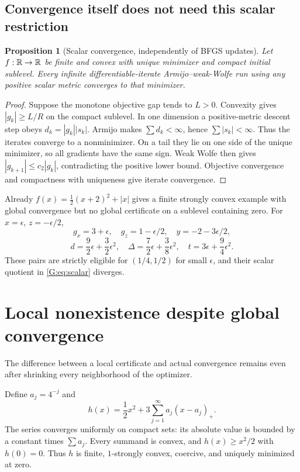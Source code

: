 \documentclass[10pt,oneside,openany]{book}
\newtheorem{proposition}{Proposition}[chapter]
\theoremstyle{remark}\newtheorem{remark}{Remark}[chapter]
\begin{document}
\subsection{Convergence itself does not need this scalar restriction}
\begin{proposition}[Scalar convergence, independently of BFGS updates]\label{G:prop:scalarconv}
Let $f:\mathbb R\to\mathbb R$ be finite and convex with unique minimizer and compact initial sublevel. Every infinite differentiable-iterate Armijo--weak-Wolfe run using any positive scalar metric converges to that minimizer.
\end{proposition}
\begin{proof}
Suppose the monotone objective gap tends to $L>0$. Convexity gives $|g_k|\ge L/R$ on the compact sublevel. In one dimension a positive-metric descent step obeys $d_k=|g_k||s_k|$. Armijo makes $\sum d_k<\infty$, hence $\sum|s_k|<\infty$. Thus the iterates converge to a nonminimizer. On a tail they lie on one side of the unique minimizer, so all gradients have the same sign. Weak Wolfe then gives $|g_{k+1}|\le c_2|g_k|$, contradicting the positive lower bound. Objective convergence and compactness with uniqueness give iterate convergence.
\end{proof}
Already $f(x)=\frac12(x+2)^2+|x|$ gives a finite strongly convex example with global convergence but no global certificate on a sublevel containing zero. For $x=\epsilon$, $z=-\epsilon/2$,
\[
 g_x=3+\epsilon,\quad g_z=1-\epsilon/2,\quad y=-2-3\epsilon/2,
\]
\[
 d=\frac92\epsilon+\frac32\epsilon^2,\quad
 \Delta=\frac72\epsilon+\frac38\epsilon^2,\quad
 t=3\epsilon+\frac94\epsilon^2.
\]
These pairs are strictly eligible for $(1/4,1/2)$ for small $\epsilon$, and their scalar quotient in \eqref{G:eq:scalar} diverges.


\setcounter{section}{6}
\setcounter{theorem}{0}
\setcounter{equation}{6}
\section{Local nonexistence despite global convergence}
The difference between a local certificate and actual convergence remains even after shrinking every neighborhood of the optimizer.

Define $a_j=4^{-j}$ and
\begin{equation}
 h(x)=\frac12x^2+3\sum_{j=1}^\infty a_j(x-a_j)_+. \label{G:eq:infinite}
\end{equation}
The series converges uniformly on compact sets: its absolute value is bounded by a constant times $\sum a_j$. Every summand is convex, and $h(x)\ge x^2/2$ with $h(0)=0$. Thus $h$ is finite, $1$-strongly convex, coercive, and uniquely minimized at zero.
\end{document}
